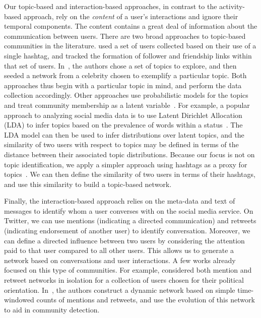 Our topic-based and interaction-based approaches, in contrast to the activity-based approach, rely on the \emph{content} of a user's interactions and ignore their temporal components. The content contains a great deal of information about the communication between users.
There are two broad approaches to topic-based communities in the literature. \cite{rossi2012conversation} used a set of users collected based on their use of a single hashtag, and tracked the formation of follower and friendship links within that set of users. In~\cite{lim2012following}, the authors chose a set of topics to explore, and then seeded a network from a celebrity chosen to exemplify a particular topic. Both approaches thus begin with a particular topic in mind, and perform the data collection accordingly. Other approaches use probabilistic models for the topics and treat community membership as a latent variable~\cite{yin2012latent}.
For example, a popular approach to analyzing social media data is to use Latent Dirichlet Allocation (LDA) to infer topics based on the prevalence of words within a status~\cite{zhao2011comparing,michelson2010discovering}. The LDA model can then be used to infer distributions over latent topics, and the similarity of two users with respect to topics may be defined in terms of the distance between their associated topic distributions. Because our focus is not on topic identification, we apply a simpler approach using hashtags as a proxy for topics~\cite{becker2011beyond,tsur2012s}. We can then define the similarity of two users in terms of their hashtags, and use this similarity to build a topic-based network.

Finally, the interaction-based approach relies on the meta-data and text of messages to identify whom a user converses with on the social media service. On Twitter, we can use mentions (indicating a directed communication) and retweets (indicating endorsement of another user) to identify conversation. Moreover, we can define a directed influence between two users by considering the attention paid to that user compared to all other users. This allows us to generate a network based on conversations and user interactions.
A few works already focused on this type of communities. For example, \cite{conover2011political} considered both mention and retweet networks in isolation for a collection of users chosen for their political orientation. In~\cite{deitrick2013mutually}, the authors construct a dynamic network based on simple time-windowed counts of mentions and retweets, and use the evolution of this network to aid in community detection.

